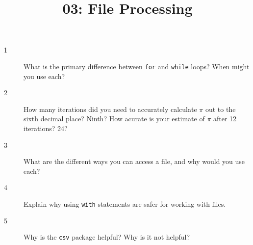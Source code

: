\documentclass[10pt]{amsart}
\title{03: File Processing}
\begin{document}
\maketitle

\begin{description}
\item[1] What is the primary difference between \verb+for+ and \verb+while+
loops? When might you use each?
\vspace{0.75in}

\item[2] How many iterations did you need to accurately calculate $\pi$ out to
the sixth decimal place? Ninth? How acurate is your estimate of $\pi$ after 12
iterations? 24?
\vspace{0.75in}

\item[3] What are the different ways you can access a file, and why would you
use each?
\vspace{0.75in}

\item[4] Explain why using \verb+with+ statements are safer for working with
files.
\vspace{0.75in}

\item[5] Why is the \verb+csv+ package helpful? Why is it not helpful?
\vspace{0.75in}
\end{description}
\end{document}
